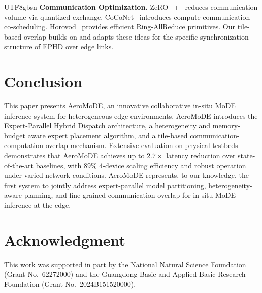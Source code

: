 \documentclass[conference]{IEEEtran}
\begin{document}
\begin{CJK*}{UTF8}{gbsn}
\textbf{Communication Optimization.}
ZeRO++~\cite{wang2023zero_pp} reduces communication volume via
quantized exchange.  CoCoNet~\cite{jangda2022breaking} introduces
compute-communication co-scheduling.  Horovod~\cite{sergeev2018horovod}
provides efficient Ring-AllReduce primitives.  Our tile-based overlap
builds on and adapts these ideas for the specific synchronization
structure of EPHD over edge links.

\section{Conclusion}
\label{sec:conclusion}

This paper presents AeroMoDE, an innovative collaborative in-situ
MoDE inference system for heterogeneous edge environments.  AeroMoDE
introduces the Expert-Parallel Hybrid Dispatch architecture, a
heterogeneity and memory-budget aware expert placement algorithm,
and a tile-based communication-computation overlap mechanism.
Extensive evaluation on physical testbeds demonstrates that AeroMoDE
achieves up to $2.7\times$ latency reduction over state-of-the-art
baselines, with $89\%$ 4-device scaling efficiency and robust
operation under varied network conditions.  AeroMoDE represents, to
our knowledge, the first system to jointly address expert-parallel
model partitioning, heterogeneity-aware planning, and fine-grained
communication overlap for in-situ MoDE inference at the edge.

\section*{Acknowledgment}
This work was supported in part by the National Natural Science
Foundation (Grant No.~62272000) and the Guangdong Basic and Applied
Basic Research Foundation (Grant No.~2024B151520000).




\end{CJK*}
\end{document}
